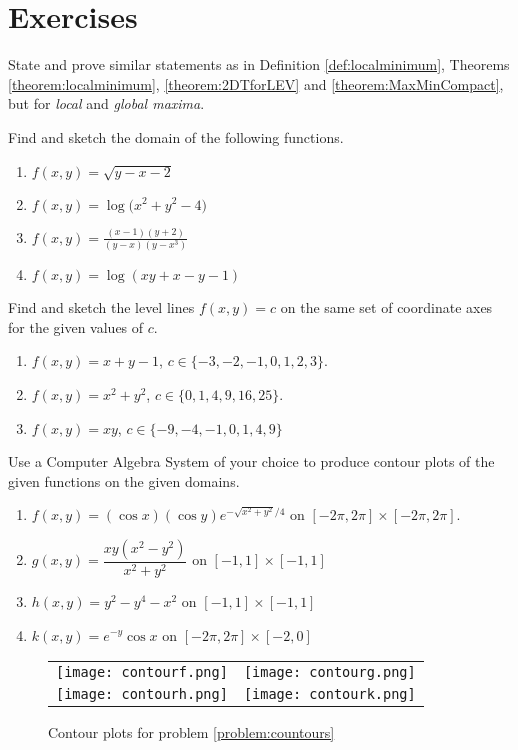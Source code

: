 
\section*{Exercises}
\begin{problem}[Advanced]
State and prove similar statements as in Definition \ref{def:localminimum}, Theorems \ref{theorem:localminimum}, \ref{theorem:2DTforLEV} and \ref{theorem:MaxMinCompact}, but for \emph{local} and \emph{global maxima}.
\end{problem}

\begin{problem}[Basic]
Find and sketch the domain of the following functions.
\begin{enumerate}
	\item $f(x,y) = \sqrt{y-x-2}$
	\item $f(x,y) = \log \big( x^2+y^2-4 \big)$
	\item $f(x,y) = \frac{(x-1)(y+2)}{(y-x)(y-x^3)}$
	\item $f(x,y) = \log (xy+x-y-1)$
\end{enumerate}
\end{problem}

\begin{problem}[Basic]
Find and sketch the level lines $f(x,y)=c$ on the same set of coordinate axes for the given values of $c$.
\begin{enumerate}
	\item $f(x,y) = x+y-1$, $c \in \{ -3, -2, -1, 0, 1, 2, 3\}$.
	\item $f(x,y) = x^2+y^2$, $c \in \{ 0, 1, 4, 9, 16, 25 \}$.
	\item $f(x,y) = xy$, $c \in \{ -9, -4, -1, 0, 1, 4, 9 \}$
\end{enumerate}
\end{problem}

\begin{problem}[CAS]\label{problem:countours}
Use a Computer Algebra System of your choice to produce contour plots of the given functions on the given domains.
\begin{enumerate}
	\item $f(x,y) = (\cos x)(\cos y) e^{-\sqrt{x^2+y^2}/4}$ on $[-2\pi, 2\pi]\times [-2\pi, 2\pi]$.
	\item $g(x,y) = \dfrac{xy(x^2-y^2)}{x^2+y^2}$ on $[-1,1] \times [-1,1]$
	\item $h(x,y) = y^2 - y^4 -x^2$ on $[-1,1]\times[-1,1]$
	\item $k(x,y) = e^{-y}\cos x$ on $[-2\pi, 2\pi]\times[-2,0]$
\end{enumerate}
\begin{figure}[ht!]
\begin{tabular}{cc}
\texttt{[image: contourf.png]} &
\texttt{[image: contourg.png]} \\
\texttt{[image: contourh.png]} &
\texttt{[image: contourk.png]} 
\end{tabular}
\caption{Contour plots for problem \ref{problem:countours}}
\end{figure}
\end{problem}

